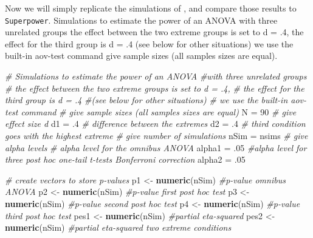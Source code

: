 \documentclass[
]{book}
\newenvironment{Shaded}{\begin{snugshade}}{\end{snugshade}}
\newcommand{\CommentTok}[1]{\textcolor[rgb]{0.56,0.35,0.01}{\textit{#1}}}
\newcommand{\DecValTok}[1]{\textcolor[rgb]{0.00,0.00,0.81}{#1}}
\newcommand{\FloatTok}[1]{\textcolor[rgb]{0.00,0.00,0.81}{#1}}
\newcommand{\KeywordTok}[1]{\textcolor[rgb]{0.13,0.29,0.53}{\textbf{#1}}}
\newcommand{\NormalTok}[1]{#1}
\newcommand{\StringTok}[1]{\textcolor[rgb]{0.31,0.60,0.02}{#1}}
\begin{document}
Now we will simply replicate the simulations of \citet{brysbaert2019many}, and compare those results to \texttt{Superpower}. Simulations to estimate the power of an ANOVA with three unrelated groups the effect between the two extreme groups is set to d = .4, the effect for the third group is d = .4 (see below for other situations) we use the built-in aov-test command give sample sizes (all samples sizes are equal).

\begin{Shaded}
\begin{Highlighting}[]
\CommentTok{# Simulations to estimate the power of an ANOVA }
\CommentTok{#with three unrelated groups}
\CommentTok{# the effect between the two extreme groups is set to d = .4, }
\CommentTok{# the effect for the third group is d = .4 }
\CommentTok{#(see below for other situations)}
\CommentTok{# we use the built-in aov-test command}
\CommentTok{# give sample sizes (all samples sizes are equal)}
\NormalTok{N =}\StringTok{ }\DecValTok{90}
\CommentTok{# give effect size d}
\NormalTok{d1 =}\StringTok{ }\FloatTok{.4} \CommentTok{# difference between the extremes}
\NormalTok{d2 =}\StringTok{ }\FloatTok{.4} \CommentTok{# third condition goes with the highest extreme}
\CommentTok{# give number of simulations}
\NormalTok{nSim =}\StringTok{ }\NormalTok{nsims}
\CommentTok{# give alpha levels}
\CommentTok{# alpha level for the omnibus ANOVA}
\NormalTok{alpha1 =}\StringTok{ }\FloatTok{.05} 
\CommentTok{#alpha level for three post hoc one-tail t-tests Bonferroni correction}
\NormalTok{alpha2 =}\StringTok{ }\FloatTok{.05} 
\end{Highlighting}
\end{Shaded}

\begin{Shaded}
\begin{Highlighting}[]
\CommentTok{# create vectors to store p-values}
\NormalTok{p1 <-}\StringTok{ }\KeywordTok{numeric}\NormalTok{(nSim) }\CommentTok{#p-value omnibus ANOVA}
\NormalTok{p2 <-}\StringTok{ }\KeywordTok{numeric}\NormalTok{(nSim) }\CommentTok{#p-value first post hoc test}
\NormalTok{p3 <-}\StringTok{ }\KeywordTok{numeric}\NormalTok{(nSim) }\CommentTok{#p-value second post hoc test}
\NormalTok{p4 <-}\StringTok{ }\KeywordTok{numeric}\NormalTok{(nSim) }\CommentTok{#p-value third post hoc test}
\NormalTok{pes1 <-}\StringTok{ }\KeywordTok{numeric}\NormalTok{(nSim) }\CommentTok{#partial eta-squared}
\NormalTok{pes2 <-}\StringTok{ }\KeywordTok{numeric}\NormalTok{(nSim) }\CommentTok{#partial eta-squared two extreme conditions}
\end{Highlighting}
\end{Shaded}
\end{document}
